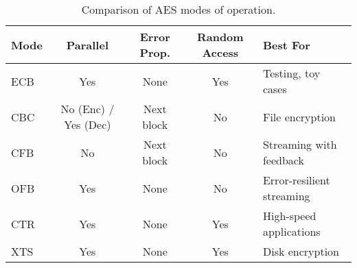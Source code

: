 \begin{table}[h]
\centering
\begin{tabular}{|l|c|c|c|l|}
\hline
\textbf{Mode} & \textbf{Parallel} & \textbf{Error Prop.} & \textbf{Random Access} & \textbf{Best For} \\
\hline
ECB & Yes & None & Yes & Testing, toy cases \\
CBC & No (Enc) / Yes (Dec) & Next block & No & File encryption \\
CFB & No & Next block & No & Streaming with feedback \\
OFB & Yes & None & No & Error-resilient streaming \\
CTR & Yes & None & Yes & High-speed applications \\
XTS & Yes & None & Yes & Disk encryption \\
\hline
\end{tabular}
\caption{Comparison of AES modes of operation.}
\end{table}